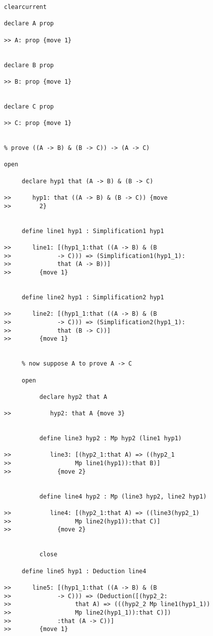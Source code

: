 \documentclass[12pt]{slides}
\begin{document}
\begin{slide}

{\tiny

\begin{verbatim}
clearcurrent

declare A prop

>> A: prop {move 1}


declare B prop

>> B: prop {move 1}


declare C prop

>> C: prop {move 1}


% prove ((A -> B) & (B -> C)) -> (A -> C)

open

     declare hyp1 that (A -> B) & (B -> C)

>>      hyp1: that ((A -> B) & (B -> C)) {move 
>>        2}


     define line1 hyp1 : Simplification1 hyp1

>>      line1: [(hyp1_1:that ((A -> B) & (B 
>>             -> C))) => (Simplification1(hyp1_1):
>>             that (A -> B))]
>>        {move 1}


     define line2 hyp1 : Simplification2 hyp1

>>      line2: [(hyp1_1:that ((A -> B) & (B 
>>             -> C))) => (Simplification2(hyp1_1):
>>             that (B -> C))]
>>        {move 1}


     % now suppose A to prove A -> C

     open

          declare hyp2 that A

>>           hyp2: that A {move 3}


          define line3 hyp2 : Mp hyp2 (line1 hyp1)

>>           line3: [(hyp2_1:that A) => ((hyp2_1 
>>                  Mp line1(hyp1)):that B)]
>>             {move 2}


          define line4 hyp2 : Mp (line3 hyp2, line2 hyp1)

>>           line4: [(hyp2_1:that A) => ((line3(hyp2_1) 
>>                  Mp line2(hyp1)):that C)]
>>             {move 2}


          close 

     define line5 hyp1 : Deduction line4

>>      line5: [(hyp1_1:that ((A -> B) & (B 
>>             -> C))) => (Deduction([(hyp2_2:
>>                  that A) => (((hyp2_2 Mp line1(hyp1_1)) 
>>                  Mp line2(hyp1_1)):that C)])
>>             :that (A -> C))]
>>        {move 1}



\end{verbatim}}
\end{slide}
\end{document}
